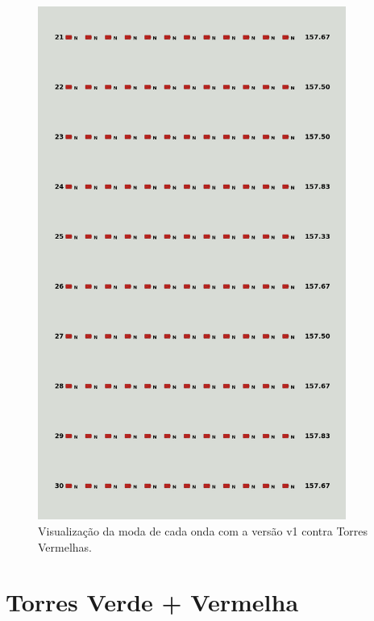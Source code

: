 \begin{figure}[H]
  \centering
  \includegraphics[width=0.9\textwidth]{figuras/td/td_allred_ai_mode_1_3.png}
  \caption{Visualização da moda de cada onda com a versão v1 contra Torres Vermelhas.}
  \label{fig:td-moda-red-1-3}
\end{figure}

\section{Torres Verde + Vermelha}
\label{sec:apend-moda-td-gr-v1}

